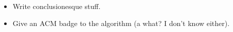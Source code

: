 \begin{itemize}
    \item Write conclusionesque stuff.
    \item Give an ACM badge to the algorithm (a what? I don't know either).
\end{itemize}

